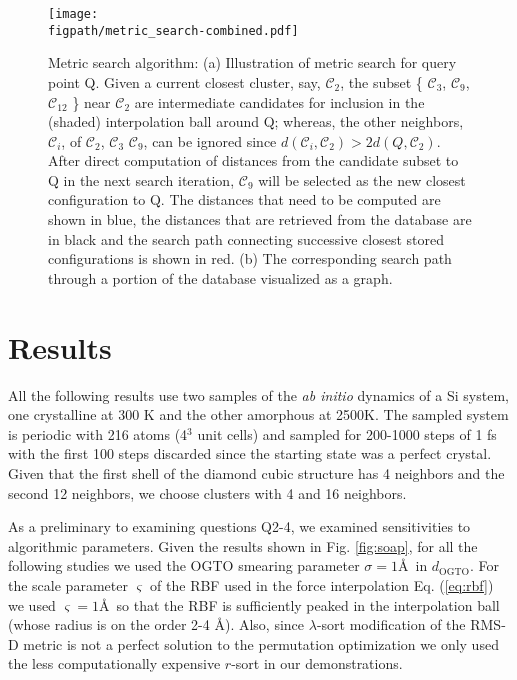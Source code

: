 \documentclass[journal=jctcce,manuscript=article]{achemso}
\newlength{\figwidth}
\newcommand{\figpath}{Figures}
\newcommand{\eref}[1]{{Eq. (\ref{#1})}}
\newcommand{\fref}[1]{{Fig. \ref{#1}}}
\newcommand{\abinitio}{{\it ab initio }}
\newcommand{\neighborhood}{\mathcal{C}}
\begin{document}
\begin{figure}[h]
{\texttt{[image: \\figpath/metric\_search-combined.pdf]}}
\caption{
Metric search algorithm:
(a) Illustration of metric search for query point Q.
Given a current closest cluster, say, $\neighborhood_2$, the subset \{  $\neighborhood_3$, $\neighborhood_9$, $\neighborhood_{12}$ \} near $\neighborhood_2$ are intermediate candidates for inclusion in the (shaded) interpolation ball around Q; whereas, the other neighbors, $\neighborhood_i$, of $\neighborhood_2$, $\neighborhood_3$ $\neighborhood_9$, can be ignored since $d(\neighborhood_i,\neighborhood_2) > 2 d(Q,\neighborhood_2)$.
After direct computation of distances from the candidate subset to Q in the next search iteration, $\neighborhood_9$ will be selected as the new closest configuration to Q.
The distances that need to be computed are shown in blue, the distances that are retrieved from the database are in black and the search path connecting successive closest stored configurations is shown in red.
(b) The corresponding search path through a portion of the database visualized as a graph.
}
\label{fig:search}
\end{figure}
 

\section{Results} \label{sec:results}

All the following results use two samples of the \abinitio dynamics of a Si system, one crystalline at 300 K  and the other amorphous at 2500K. 
The sampled system is periodic with 216 atoms (4$^3$ unit cells) and sampled for 200-1000 steps of 1 fs with the first 100 steps discarded since the starting state was a perfect crystal.
Given that the first shell of the diamond cubic structure has 4 neighbors and the second 12 neighbors, we choose clusters with 4 and 16 neighbors.


As a preliminary to examining questions Q2-4, we examined sensitivities to algorithmic parameters.
Given the results shown in \fref{fig:soap}, for all the following studies we used the OGTO smearing parameter  $\sigma = 1 $\AA \ in $d_\text{OGTO}$.
For the scale parameter $\varsigma$ of the RBF used in the force interpolation \eref{eq:rbf} we used $\varsigma = 1 $\AA \ so that the RBF is sufficiently peaked in the interpolation ball (whose radius is on the order 2-4 \AA).
Also, since $\lambda$-sort modification of the RMS-D metric is not a perfect solution to the permutation optimization we only used the less computationally expensive $r$-sort in our demonstrations.
\end{document}
